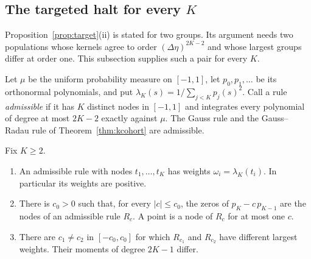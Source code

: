 \subsection{The targeted halt for every $K$}\label{app:everyK}

Proposition~\ref{prop:target}(ii) is stated for two groups. Its argument needs two populations whose kernels agree to order $(\Delta\eta)^{2K-2}$ and whose largest groups differ at order one. This subsection supplies such a pair for every $K$.

Let $\mu$ be the uniform probability measure on $[-1,1]$, let $p_0,p_1,\ldots$ be its orthonormal polynomials, and put $\lambda_K(s)=1/\sum_{j<K}p_j(s)^2$. Call a rule \emph{admissible} if it has $K$ distinct nodes in $[-1,1]$ and integrates every polynomial of degree at most $2K-2$ exactly against $\mu$. The Gauss rule and the Gauss--Radau rule of Theorem~\ref{thm:kcohort} are admissible.

\begin{lemma}\label{lem:everyK}
Fix $K\ge2$.
\begin{enumerate}[label=(\roman*),itemsep=1pt]
\item An admissible rule with nodes $t_1,\ldots,t_K$ has weights $\omega_i=\lambda_K(t_i)$. In particular its weights are positive.
\item There is $c_0>0$ such that, for every $|c|\le c_0$, the zeros of $p_K-c\,p_{K-1}$ are the nodes of an admissible rule $R_c$. A point is a node of $R_c$ for at most one $c$.
\item There are $c_1\ne c_2$ in $[-c_0,c_0]$ for which $R_{c_1}$ and $R_{c_2}$ have different largest weights. Their moments of degree $2K-1$ differ.
\end{enumerate}
\end{lemma}

